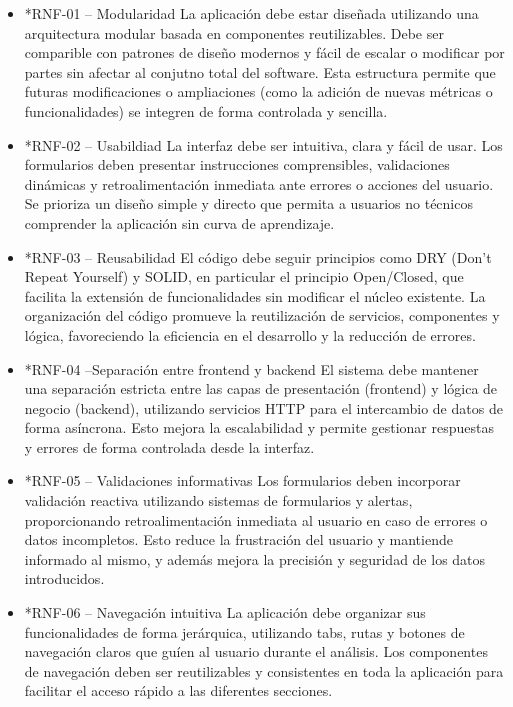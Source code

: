 \begin{itemize}

    \item*{RNF-01 – Modularidad}
    La aplicación debe estar diseñada utilizando una arquitectura modular basada en componentes reutilizables. Debe ser comparible con patrones de diseño modernos y fácil de escalar o modificar por partes sin afectar al conjutno total del software. Esta estructura permite que futuras modificaciones o ampliaciones (como la adición de nuevas métricas o funcionalidades) se integren de forma controlada y sencilla.
    
    \item*{RNF-02 – Usabildiad}
    La interfaz debe ser intuitiva, clara y fácil de usar. Los formularios deben presentar instrucciones comprensibles, validaciones dinámicas y retroalimentación inmediata ante errores o acciones del usuario. Se prioriza un diseño simple y directo que permita a usuarios no técnicos comprender la aplicación sin curva de aprendizaje.
    
    \item*{RNF-03 – Reusabilidad}
    El código debe seguir principios como DRY (Don’t Repeat Yourself) y SOLID, en particular el principio Open/Closed, que facilita la extensión de funcionalidades sin modificar el núcleo existente. La organización del código promueve la reutilización de servicios, componentes y lógica, favoreciendo la eficiencia en el desarrollo y la reducción de errores.
    
    \item*{RNF-04 –Separación entre frontend y backend}
    El sistema debe mantener una separación estricta entre las capas de presentación (frontend) y lógica de negocio (backend), utilizando servicios HTTP para el intercambio de datos de forma asíncrona. Esto mejora la escalabilidad y permite gestionar respuestas y errores de forma controlada desde la interfaz.
    
    \item*{RNF-05 – Validaciones informativas}
    Los formularios deben incorporar validación reactiva utilizando sistemas de formularios y alertas, proporcionando retroalimentación inmediata al usuario en caso de errores o datos incompletos. Esto reduce la frustración del usuario y mantiende informado al mismo, y además mejora la precisión y seguridad de los datos introducidos.
    
    \item*{RNF-06 – Navegación intuitiva}
    La aplicación debe organizar sus funcionalidades de forma jerárquica, utilizando tabs, rutas y botones de navegación claros que guíen al usuario durante el análisis. Los componentes de navegación deben ser reutilizables y consistentes en toda la aplicación para facilitar el acceso rápido a las diferentes secciones.

\end{itemize}


